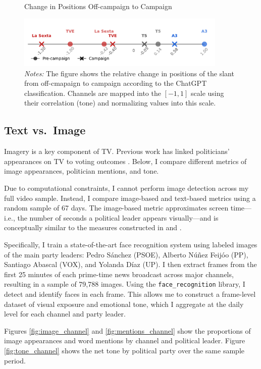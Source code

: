 \documentclass[12pt]{article}
\begin{document}
\begin{figure}[ht!]
	\centering
	\caption{Change in Positions Off-campaign to Campaign}
	\includegraphics[width=100mm]{figures/congress_line_chatgpt_pre_post}
	
	\caption*{\small \textit{Notes:} The figure shows the relative change in  positions of the slant from off-cmapaign to campaign according to the ChatGPT classification. 			Channels are mapped into the $[-1,1]$ scale using their correlation (tone) and normalizing values into this scale. }
	\label{fig:change_line}
\end{figure}

\subsection*{Text vs.\ Image}

Imagery is a key component of TV. Previous work has linked politicians’ appearances on TV to voting outcomes \citep{tv_appeareance}. Below, I compare different metrics of image appearances, politician mentions, and tone.

Due to computational constraints, I cannot perform image detection across my full video sample. Instead, I compare image-based and text-based metrics using a random sample of 67 days. The image-based metric approximates screen time—i.e., the number of seconds a political leader appears visually—and is conceptually similar to the measures constructed in \cite{CageHengelHerveUrvoy2022} and \cite{durante2012partisan}.

Specifically, I train a state-of-the-art face recognition system \citep{face_recognition} using labeled images of the main party leaders: Pedro Sánchez (PSOE), Alberto Núñez Feijóo (PP), Santiago Abascal (VOX), and Yolanda Díaz (UP). I then extract frames from the first 25 minutes of each prime-time news broadcast across major channels, resulting in a sample of 79,788 images. Using the \texttt{face\_recognition} library, I detect and identify faces in each frame. This allows me to construct a frame-level dataset of visual exposure and emotional tone, which I aggregate at the daily level for each channel and party leader.

Figures \ref{fig:image_channel} and \ref{fig:mentions_channel} show the proportions of image appearances and word mentions by channel and political leader. Figure \ref{fig:tone_channel} shows the net tone by political party over the same sample period.
\end{document}
